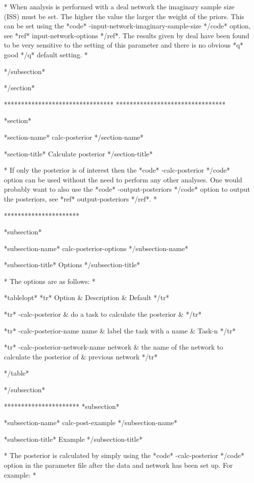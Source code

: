 * When analysis is performed with a deal network the imaginary sample size (ISS) must be set. The higher the value the larger the weight of the priors. This can be set using the *code* -input-network-imaginary-sample-size */code* option, see *ref* input-network-options */ref*. The results given by deal have been found to be very sensitive to the setting of this parameter and there is no obvious *q* good */q* default setting. *


*/subsection*


*/section*

******************************** ********************************

*section*

*section-name* calc-posterior */section-name*

*section-title* Calculate posterior */section-title*

* If only the posterior is of interest then the *code* -calc-posterior */code* option can be used without the need to perform any other analyses. One would probably want to also use the *code* -output-posteriors */code* option to output the posteriors, see *ref* output-posteriors */ref*. *

**********************

*subsection*

*subsection-name* calc-posterior-options */subsection-name*

*subsection-title* Options */subsection-title*

* The options are as follows: *

*tablelopt* *tr* Option & Description & Default */tr*

*tr*
 -calc-posterior  & do a task to calculate the posterior &
*/tr*

*tr*
  -calc-posterior-name name & label the task with a name & Task-n
*/tr*

*tr*
  -calc-posterior-network-name network & the name of the network to calculate the posterior of & previous network
*/tr*

*/table*

*/subsection*

********************** *subsection*

*subsection-name* calc-post-example */subsection-name*

*subsection-title* Example */subsection-title*

* The posterior is calculated by simply using the *code* -calc-posterior */code* option in the parameter file after the data and network has been set up. For example: *

